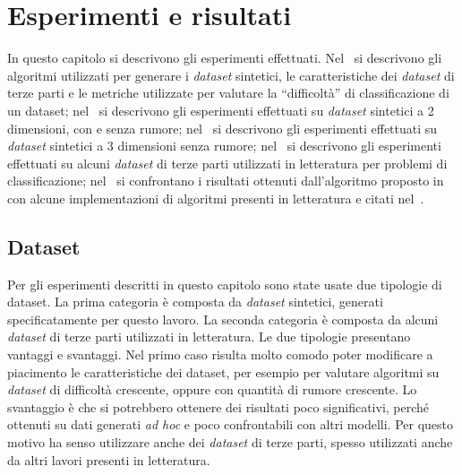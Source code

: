 \chapter{Esperimenti e risultati}
\label{chap:esperimenti}
In questo capitolo si descrivono gli esperimenti effettuati.
Nel~ si descrivono gli algoritmi utilizzati per generare i \emph{dataset} sintetici, le caratteristiche dei \emph{dataset} di terze parti e le metriche utilizzate per valutare la ``difficoltà'' di classificazione di un dataset;
nel~ si descrivono gli esperimenti effettuati su \emph{dataset} sintetici a 2 dimensioni, con e senza rumore;
nel~ si descrivono gli esperimenti effettuati su \emph{dataset} sintetici a 3 dimensioni senza rumore;
nel~ si descrivono gli esperimenti effettuati su alcuni \emph{dataset} di terze parti utilizzati in letteratura per problemi di classificazione;
nel~ si confrontano i risultati ottenuti dall'algoritmo proposto in~ con alcune implementazioni di algoritmi presenti in letteratura e citati nel~.

\section{Dataset}\label{sec:exp:dataset}
Per gli esperimenti descritti in questo capitolo sono state usate due tipologie di dataset. 
La prima categoria è composta da \emph{dataset} sintetici, generati specificatamente per questo lavoro. 
La seconda categoria è composta da alcuni \emph{dataset} di terze parti utilizzati in letteratura. 
Le due tipologie presentano vantaggi e svantaggi. Nel primo caso risulta molto comodo poter modificare a piacimento le caratteristiche dei dataset, per esempio per valutare algoritmi su \emph{dataset} di difficoltà crescente, oppure con quantità di rumore crescente.
Lo svantaggio è che si potrebbero ottenere dei risultati poco significativi, perché ottenuti su dati generati \emph{ad hoc} e poco confrontabili con altri modelli. 
Per questo motivo ha senso utilizzare anche dei \emph{dataset} di terze parti, spesso utilizzati anche da altri lavori presenti in letteratura.

